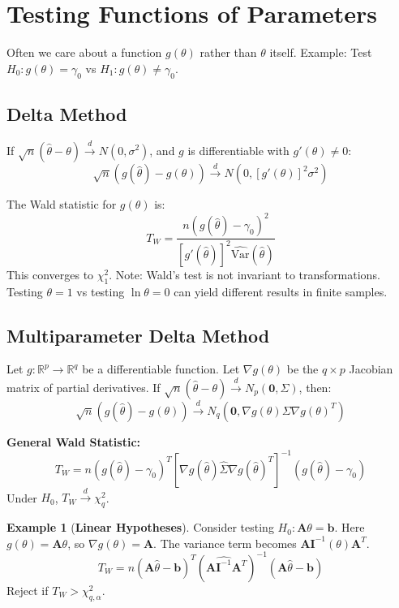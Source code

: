 \documentclass[12pt, a4paper]{article}
\theoremstyle{definition}
\newtheorem{example}{Example}
\newcommand{\R}{\mathbb{R}}
\newcommand{\Var}{\text{Var}}
\begin{document}
\section{Testing Functions of Parameters}
Often we care about a function $g(\theta)$ rather than $\theta$ itself.
Example: Test $H_0: g(\theta) = \gamma_0$ vs $H_1: g(\theta) \neq \gamma_0$.

\subsection{Delta Method}
If $\sqrt{n}(\hat{\theta} - \theta) \xrightarrow{d} N(0, \sigma^2)$, and $g$ is differentiable with $g'(\theta) \neq 0$:
$$ \sqrt{n}(g(\hat{\theta}) - g(\theta)) \xrightarrow{d} N(0, [g'(\theta)]^2 \sigma^2) $$

The Wald statistic for $g(\theta)$ is:
$$ T_W = \frac{n(g(\hat{\theta}) - \gamma_0)^2}{[g'(\hat{\theta})]^2 \widehat{\Var}(\hat{\theta})} $$
This converges to $\chi^2_1$.
Note: Wald's test is not invariant to transformations. Testing $\theta = 1$ vs testing $\ln \theta = 0$ can yield different results in finite samples.

\subsection{Multiparameter Delta Method}
Let $g: \R^p \to \R^q$ be a differentiable function.
Let $\nabla g(\theta)$ be the $q \times p$ Jacobian matrix of partial derivatives.
If $\sqrt{n}(\hat{\theta} - \theta) \xrightarrow{d} N_p(\mathbf{0}, \Sigma)$, then:
$$ \sqrt{n}(g(\hat{\theta}) - g(\theta)) \xrightarrow{d} N_q(\mathbf{0}, \nabla g(\theta) \Sigma \nabla g(\theta)^T) $$

\textbf{General Wald Statistic:}
$$ T_W = n (g(\hat{\theta}) - \gamma_0)^T \left[ \nabla g(\hat{\theta}) \widehat{\Sigma} \nabla g(\hat{\theta})^T \right]^{-1} (g(\hat{\theta}) - \gamma_0) $$
Under $H_0$, $T_W \xrightarrow{d} \chi^2_q$.

\begin{example}[\textbf{Linear Hypotheses}]
Consider testing $H_0: \mathbf{A}\theta = \mathbf{b}$.
Here $g(\theta) = \mathbf{A}\theta$, so $\nabla g(\theta) = \mathbf{A}$.
The variance term becomes $\mathbf{A} \mathbf{I}^{-1}(\theta) \mathbf{A}^T$.
$$ T_W = n (\mathbf{A}\hat{\theta} - \mathbf{b})^T (\mathbf{A} \widehat{\mathbf{I}^{-1}} \mathbf{A}^T)^{-1} (\mathbf{A}\hat{\theta} - \mathbf{b}) $$
Reject if $T_W > \chi^2_{q, \alpha}$.
\end{example}
\end{document}
